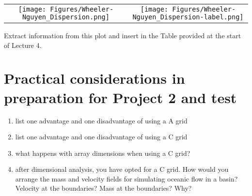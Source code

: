 \begin{center}
	\begin{tabular}{cc}
		\texttt{[image: Figures/Wheeler-Nguyen\_Dispersion.png]} &
		\texttt{[image: Figures/Wheeler-Nguyen\_Dispersion-label.png]}
	\end{tabular}
\end{center}

\begin{exercise}
Extract information from this plot and insert in the Table provided at the start of Lecture 4.
\end{exercise}


\section{Practical considerations in preparation for Project 2 and test}
\begin{enumerate}
	\item list one advantage and one disadvantage of using a A grid
	\item list one advantage and one disadvantage of using a C grid
	\item what happens with array dimensions when using a C grid?
	\item after dimensional analysis, you have opted for a C grid. How would you arrange the mass and velocity fields for simulating oceanic flow in a basin?
	Velocity at the boundaries? Mass at the boundaries? Why?
\end{enumerate}
